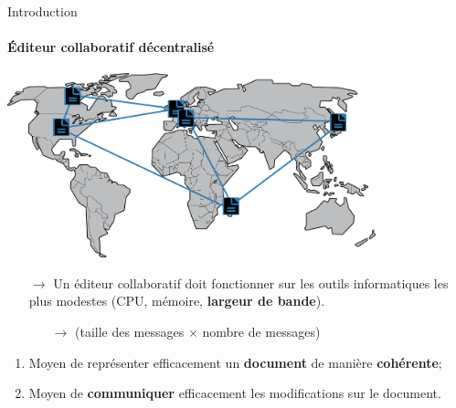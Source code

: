 \begin{frame}{Introduction}\framesubtitle{Éditeur collaboratif décentralisé}
  
  \begin{center}
    \includegraphics[width=0.8\textwidth]{img/world.png}
  \end{center}

  \vspace{0.25cm}

  \begin{itemize}
  \item [$\rightarrow$] Un éditeur collaboratif doit fonctionner sur les outils
    informatiques les plus modestes (CPU, mémoire, \textbf{largeur de bande}).
    \begin{itemize}
    \item [$\rightarrow$] (taille des messages $\times$ nombre de messages)
    \end{itemize}
  \end{itemize}

  \vspace{0.25cm}
  
  \begin{enumerate}
  \item Moyen de représenter efficacement un \textbf{document} de manière
    \textbf{cohérente}; %
  \item Moyen de \textbf{communiquer} efficacement les modifications sur le
    document. %
  \end{enumerate}


\end{frame}


